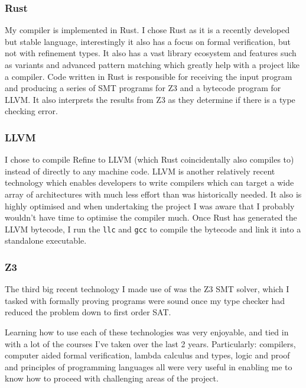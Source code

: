 \subsubsection{Rust}

My compiler is implemented in Rust.
I chose Rust as it is a recently developed but stable language, interestingly it also has a focus
on formal verification, but not with refinement types.
It also has a vast library ecosystem and features such as variants and advanced pattern matching
which greatly help with a project like a compiler.
Code written in Rust is responsible for receiving the input program and producing a series of SMT
programs for Z3 and a bytecode program for LLVM.
It also interprets the results from Z3 as they determine if there is a type checking error.

\subsubsection{LLVM}

I chose to compile Refine to LLVM (which Rust coincidentally also compiles to) instead of
directly to any machine code.
LLVM is another relatively recent technology which enables developers to write compilers which can
target a wide array of architectures with much less effort than was historically needed.
It also is highly optimised and when undertaking the project I was aware that I probably wouldn't
have time to optimise the compiler much.
Once Rust has generated the LLVM bytecode, I run the \texttt{llc} and \texttt{gcc} to compile the
bytecode and link it into a standalone executable.

\subsubsection{Z3}

The third big recent technology I made use of was the Z3 SMT solver, which I tasked with formally
proving programs were sound once my type checker had reduced the problem down to first order SAT.

\bigskip

Learning how to use each of these technologies was very enjoyable, and tied in with a lot of the
courses I've taken over the last 2 years.
Particularly: compilers, computer aided formal verification, lambda calculus and types, logic and proof
and principles of programming languages all were very useful in enabling me to know how to proceed
with challenging areas of the project.

